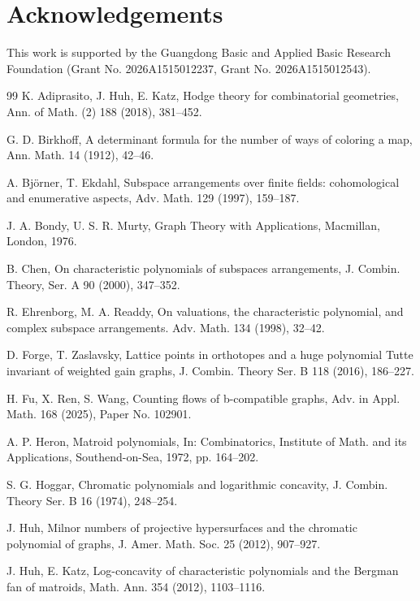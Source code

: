 \documentclass[12pt]{article}%
\numberwithin{equation}{section}
\begin{document}
\section*{Acknowledgements}
This work is supported by the Guangdong Basic and Applied Basic Research Foundation (Grant No. 2026A1515012237, Grant No. 2026A1515012543). 
\begin{thebibliography}{99}\setlength{\itemsep}{-.mm}
K. Adiprasito, J. Huh, E. Katz, Hodge theory for combinatorial geometries, Ann. of Math. (2) 188 (2018), 381--452.

G. D. Birkhoff, A determinant formula for the number of ways of coloring a map, Ann. Math. 14 (1912), 42--46.

A. Bj\"{o}rner, T. Ekdahl, Subspace arrangements over finite fields: cohomological and enumerative aspects, Adv. Math. 129 (1997), 159--187.

J. A. Bondy, U. S. R. Murty, Graph Theory with Applications, Macmillan, London, 1976.

B. Chen, On characteristic polynomials of subspaces arrangements, J. Combin. Theory, Ser. A 90 (2000), 347--352.

R. Ehrenborg, M. A. Readdy, On valuations, the characteristic polynomial, and complex subspace arrangements. Adv. Math. 134 (1998), 32--42.

D. Forge, T. Zaslavsky, Lattice points in orthotopes and a huge polynomial Tutte invariant of weighted gain graphs, J. Combin. Theory Ser. B 118 (2016), 186--227.

H. Fu, X. Ren, S. Wang, Counting flows of b-compatible graphs, Adv. in Appl. Math. 168 (2025),  Paper No. 102901.

A. P. Heron, Matroid polynomials, In: Combinatorics, Institute of Math. and its Applications, Southend-on-Sea, 1972, pp. 164--202.

S. G. Hoggar, Chromatic polynomials and logarithmic concavity, J. Combin. Theory Ser. B 16 (1974), 248--254.

J. Huh, Milnor numbers of projective hypersurfaces and the chromatic polynomial of graphs, J. Amer. Math. Soc. 25 (2012), 907--927.

J. Huh, E. Katz, Log-concavity of characteristic polynomials and the Bergman fan of matroids, Math. Ann. 354 (2012), 1103--1116.


\end{thebibliography}
\end{document}
